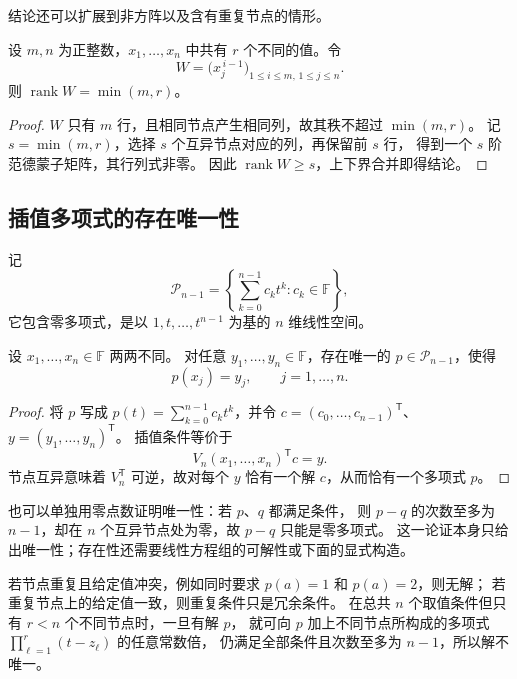 \documentclass[UTF8,12pt,a4paper,fontset=fandol]{ctexart}
\begin{document}
结论还可以扩展到非方阵以及含有重复节点的情形。

\begin{proposition}[矩形取值矩阵的秩]
\label{prop:rectangular-rank}
设 $m,n$ 为正整数，$x_1,\ldots,x_n$ 中共有 $r$ 个不同的值。令
\[
  W=\bigl(x_j^{\,i-1}\bigr)_{1\leq i\leq m,\,1\leq j\leq n}.
\]
则 $\operatorname{rank}W=\min(m,r)$。
\end{proposition}

\begin{proof}
$W$ 只有 $m$ 行，且相同节点产生相同列，故其秩不超过 $\min(m,r)$。
记 $s=\min(m,r)$，选择 $s$ 个互异节点对应的列，再保留前 $s$ 行，
得到一个 $s$ 阶范德蒙子矩阵，其行列式非零。
因此 $\operatorname{rank}W\geq s$，上下界合并即得结论。
\end{proof}

\subsection{插值多项式的存在唯一性}

记
\[
  \mathcal P_{n-1}=\left\{\sum_{k=0}^{n-1}c_kt^k:c_k\in\mathbb F\right\},
\]
它包含零多项式，是以 $1,t,\ldots,t^{n-1}$ 为基的 $n$ 维线性空间。

\begin{theorem}[多项式插值的存在唯一性]
\label{thm:interpolation}
设 $x_1,\ldots,x_n\in\mathbb F$ 两两不同。
对任意 $y_1,\ldots,y_n\in\mathbb F$，存在唯一的 $p\in\mathcal P_{n-1}$，使得
\[
  p(x_j)=y_j,\qquad j=1,\ldots,n.
\]
\end{theorem}

\begin{proof}
将 $p$ 写成 $p(t)=\sum_{k=0}^{n-1}c_kt^k$，并令
$c=(c_0,\ldots,c_{n-1})^{\mathsf T}$、$y=(y_1,\ldots,y_n)^{\mathsf T}$。
插值条件等价于
\begin{equation}
  V_n(x_1,\ldots,x_n)^{\mathsf T}c=y.
  \label{eq:interpolation-system}
\end{equation}
节点互异意味着 $V_n^{\mathsf T}$ 可逆，故对每个 $y$ 恰有一个解 $c$，从而恰有一个多项式 $p$。
\end{proof}

也可以单独用零点数证明唯一性：若 $p$、$q$ 都满足条件，
则 $p-q$ 的次数至多为 $n-1$，却在 $n$ 个互异节点处为零，故 $p-q$ 只能是零多项式。
这一论证本身只给出唯一性；存在性还需要线性方程组的可解性或下面的显式构造。

若节点重复且给定值冲突，例如同时要求 $p(a)=1$ 和 $p(a)=2$，则无解；
若重复节点上的给定值一致，则重复条件只是冗余条件。
在总共 $n$ 个取值条件但只有 $r<n$ 个不同节点时，一旦有解 $p$，
就可向 $p$ 加上不同节点所构成的多项式 $\prod_{\ell=1}^r(t-z_\ell)$ 的任意常数倍，
仍满足全部条件且次数至多为 $n-1$，所以解不唯一。
\end{document}
